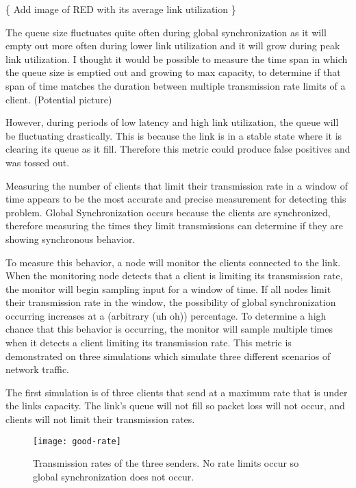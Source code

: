 \documentclass{article}
\begin{document}
																			\{ Add image of RED with its average link utilization \}\newline
	
	The queue size fluctuates quite often during global synchronization as it will empty out more often during lower link utilization and it will grow during peak link utilization. I thought it would be possible to measure the time span in which the queue size is emptied out and growing to max capacity, to determine if that span of time matches the duration between multiple transmission rate limits of a client.\newline
	(Potential picture)\newline
	
	However, during periods of low latency and high link utilization, the queue will be fluctuating drastically. This is because the link is in a stable state where it is clearing its queue as it fill. Therefore this metric could produce false positives and was tossed out.\newline
	
	Measuring the number of clients that limit their transmission rate in a window of time appears to be the most accurate and precise measurement for detecting this problem. Global Synchronization occurs because the clients are synchronized, therefore measuring the times they limit transmissions can determine if they are showing synchronous behavior.\newline
																	
	To measure this behavior, a node will monitor the clients connected to the link. When the monitoring node detects that a client is limiting its transmission rate, the monitor will begin sampling input for a window of time. If all nodes limit their transmission rate in the window, the possibility of global synchronization occurring increases at a (arbitrary (uh oh)) percentage. To determine a high chance that this behavior is occurring, the monitor will sample multiple times when it detects a client limiting its transmission rate.\newline
	This metric is demonstrated on three simulations which simulate three different scenarios of network traffic.\newline
	
	The first simulation is of three clients that send at a maximum rate that is under the links capacity. The link's queue will not fill so packet loss will not occur, and clients will not limit their transmission rates.\newline
	\begin{figure}[H]
		\centering
		\texttt{[image: good-rate]}
		\caption{Transmission rates of the three senders. No rate limits occur so global synchronization does not occur.}
	\end{figure}
\end{document}

